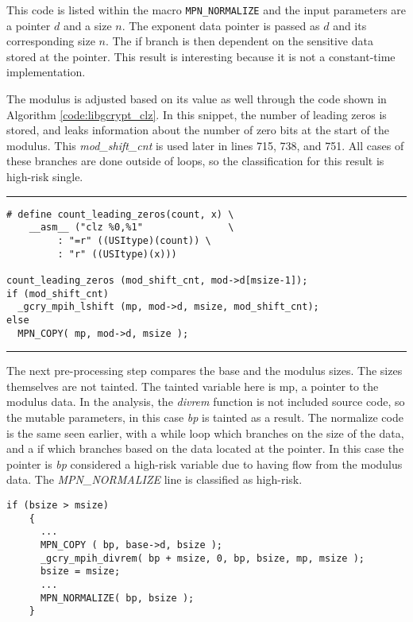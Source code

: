 \documentclass[11pt,a4paper]{article}
\newcommand{\codevar}[1]{\textit{#1}}
\newcommand{\codefn}[1]{\textit{#1}}
\begin{document}
This code is listed within the macro \texttt{MPN\_NORMALIZE} and the input
parameters are a pointer $d$ and a size $n$. The exponent data pointer is passed
as $d$ and its corresponding size $n$. The if branch is then dependent on the
sensitive data stored at the pointer. This result is interesting because it is
not a constant-time implementation. 
    

The modulus is adjusted based on its value as well through the code shown in
Algorithm \ref{code:libgcrypt_clz}. In this snippet, the number of leading zeros
is stored, and leaks information about the number of zero bits at the start of
the modulus. This \textit{mod\_shift\_cnt} is used later in lines 715, 738, and
751. All cases of these branches are done outside of loops, so the
classification for this result is high-risk single.

\vspace{5pt}
\hrule
\begin{lstlisting}[caption=Libgcrypt 1.8.2 - mpi-pow.c lines 483-487, label=code:libgcrypt_clz]
# define count_leading_zeros(count, x) \
    __asm__ ("clz %0,%1"               \
	     : "=r" ((USItype)(count)) \
	     : "r" ((USItype)(x)))

count_leading_zeros (mod_shift_cnt, mod->d[msize-1]);
if (mod_shift_cnt)
  _gcry_mpih_lshift (mp, mod->d, msize, mod_shift_cnt);
else
  MPN_COPY( mp, mod->d, msize );
\end{lstlisting}
\hrule
\vspace{5pt}

The next pre-processing step compares the base and the modulus sizes. The sizes
themselves are not tainted. The tainted variable here is mp, a pointer to the
modulus data. In the analysis, the \textit{divrem} function is not included
source code, so the mutable parameters, in this case \codevar{bp} is tainted as a
result. The normalize code is the same seen earlier, with a while loop which
branches on the size of the data, and a if which branches based on the data
located at the pointer. In this case the pointer is \codevar{bp} considered a
high-risk variable due to having flow from the modulus data. The
\codefn{MPN\_NORMALIZE} line is classified as high-risk.

\begin{lstlisting}[caption=Libgcrypt 1.8.2 - mpi-pow.c lines 491-507]
  if (bsize > msize)
    {
      ... 
      MPN_COPY ( bp, base->d, bsize );
      _gcry_mpih_divrem( bp + msize, 0, bp, bsize, mp, msize );
      bsize = msize;
      ...
      MPN_NORMALIZE( bp, bsize );
    }
\end{lstlisting}
\end{document}

